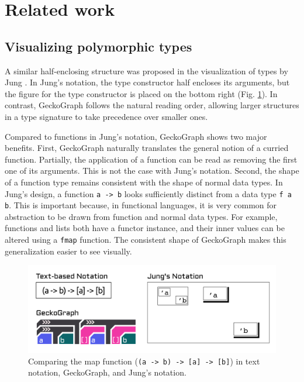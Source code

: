 \documentclass[preprint,12pt]{elsarticle}
\begin{document}
\section{Related work}
\subsection{Visualizing polymorphic types}
A similar half-enclosing structure was proposed in the visualization of types by Jung \cite{Jung2000-oc}. In Jung's notation, the type constructor half encloses its arguments, but the figure for the type constructor is placed on the bottom right (Fig. \ref{fig:jung}).  In contrast, GeckoGraph follows the natural reading order, allowing larger structures in a type signature to take precedence over smaller ones. 

Compared to functions in Jung's notation,  GeckoGraph shows two major benefits. First, GeckoGraph naturally translates the general notion of a curried function. Partially, the application of a function can be read as removing the first one of its arguments. This is not the case with Jung's notation. Second, the shape of a function type remains consistent with the shape of normal data types. In Jung's design, a function \texttt{a -> b} looks sufficiently distinct from a data type \texttt{f a b}. This is important because, in functional languages, it is very common for abstraction to be drawn from function and normal data types. For example,  functions and lists both have a functor instance, and their inner values can be altered using a \texttt{fmap} function. The consistent shape of GeckoGraph makes this generalization easier to see visually. 

\begin{figure}[]
  \includegraphics[width=\linewidth]{figures/Jung}
  \caption{
        \label{fig:jung}
        Comparing the map function (\texttt{(a -> b) -> [a] -> [b]}) in text notation, GeckoGraph, and Jung's notation.
  }
\end{figure}
\end{document}
